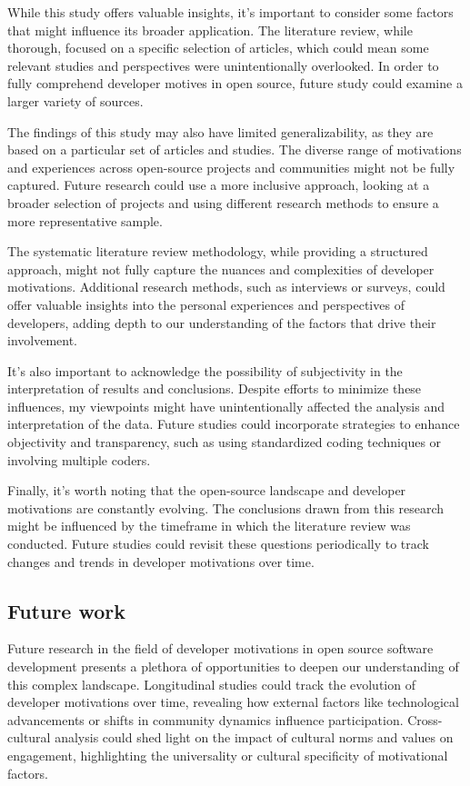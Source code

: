 While this study offers valuable insights, it's important to consider some factors that might influence its broader application. The literature review, while thorough, focused on a specific selection of articles, which could mean some relevant studies and perspectives were unintentionally overlooked. In order to fully comprehend developer motives in open source, future study could examine a larger variety of sources.


The findings of this study may also have limited generalizability, as they are based on a particular set of articles and studies. The diverse range of motivations and experiences across open-source projects and communities might not be fully captured. Future research could use a more inclusive approach, looking at a broader selection of projects and using different research methods to ensure a more representative sample.

The systematic literature review methodology, while providing a structured approach, might not fully capture the nuances and complexities of developer motivations. Additional research methods, such as interviews or surveys, could offer valuable insights into the personal experiences and perspectives of developers, adding depth to our understanding of the factors that drive their involvement.

It's also important to acknowledge the possibility of subjectivity in the interpretation of results and conclusions. Despite efforts to minimize these influences, my viewpoints might have unintentionally affected the analysis and interpretation of the data. Future studies could incorporate strategies to enhance objectivity and transparency, such as using standardized coding techniques or involving multiple coders.

Finally, it's worth noting that the open-source landscape and developer motivations are constantly evolving. The conclusions drawn from this research might be influenced by the timeframe in which the literature review was conducted. Future studies could revisit these questions periodically to track changes and trends in developer motivations over time.


\subsection{Future work}

Future research in the field of developer motivations in open source software development presents a plethora of opportunities to deepen our understanding of this complex landscape.  Longitudinal studies could track the evolution of developer motivations over time, revealing how external factors like technological advancements or shifts in community dynamics influence participation.  Cross-cultural analysis could shed light on the impact of cultural norms and values on engagement, highlighting the universality or cultural specificity of motivational factors.

